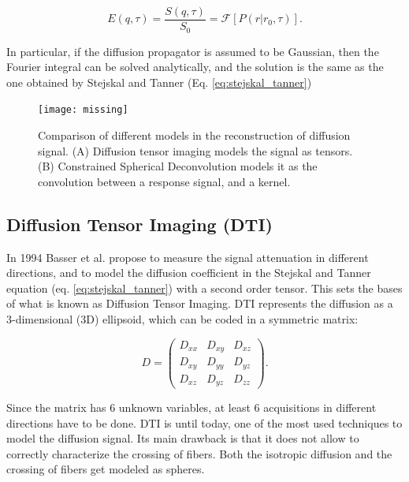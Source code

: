 \begin{equation}
    \label{eq:fourier_callaghan}
    E(q, \tau) = \frac{S(q, \tau)}{S_0} =
    \mathcal{F}[P(r|r_0, \tau)].
\end{equation}

In particular, if the diffusion propagator is assumed to be Gaussian, then the
Fourier integral can be solved analytically, and the solution is the same
as the one obtained by Stejskal and Tanner (Eq. \ref{eq:stejskal_tanner})

\begin{figure}[h]
    \texttt{[image: missing]}
    \caption{Comparison of different models in the reconstruction of diffusion
             signal. (A) Diffusion tensor imaging models the signal as tensors.
             (B) Constrained Spherical Deconvolution models it as the convolution
             between a response signal, and a kernel.}
     \label{fig:dwi_models}
\end{figure}

\subsection{Diffusion Tensor Imaging (DTI)}
\label{sec:dti}
In 1994 Basser et al. \cite{Basser1994} propose to measure the signal attenuation
in different directions, and to model the diffusion coefficient in the Stejskal and
Tanner equation (eq. \ref{eq:stejskal_tanner}) with a second order tensor. This
sets the bases of what is known as Diffusion Tensor Imaging. DTI represents the
diffusion as a 3-dimensional (3D) ellipsoid, which can be coded in a symmetric
matrix:

$$
    D =
    \begin{pmatrix}
             D_{xx} & D_{xy} & D_{xz} \\
             D_{xy} & D_{yy} & D_{yz} \\
             D_{xz} & D_{yz} & D_{zz}    
    \end{pmatrix}.
$$

Since the matrix has 6 unknown variables, at least 6 acquisitions in different
directions have to be done. DTI is until today, one
of the most used techniques to model the diffusion signal. Its main drawback
is that it does not allow to correctly characterize the crossing of fibers. Both
the isotropic diffusion and the crossing of fibers get modeled as spheres.

